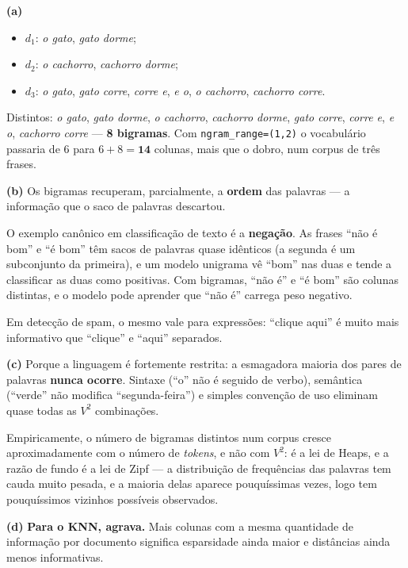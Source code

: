 \documentclass[11pt,a4paper]{article}
\begin{document}
\begin{solucao}
\textbf{(a)}
\begin{itemize}[leftmargin=1.4cm]
  \item $d_1$: \emph{o gato}, \emph{gato dorme};
  \item $d_2$: \emph{o cachorro}, \emph{cachorro dorme};
  \item $d_3$: \emph{o gato}, \emph{gato corre}, \emph{corre e}, \emph{e o},
        \emph{o cachorro}, \emph{cachorro corre}.
\end{itemize}
Distintos: \emph{o gato}, \emph{gato dorme}, \emph{o cachorro},
\emph{cachorro dorme}, \emph{gato corre}, \emph{corre e}, \emph{e o},
\emph{cachorro corre} --- \textbf{8 bigramas}. Com \texttt{ngram\_range=(1,2)} o
vocabulário passaria de $6$ para $6+8=\mathbf{14}$ colunas, mais que o dobro,
num corpus de três frases.

\smallskip
\textbf{(b)} Os bigramas recuperam, parcialmente, a \textbf{ordem} das palavras
--- a informação que o saco de palavras descartou.

O exemplo canônico em classificação de texto é a \textbf{negação}. As frases
``não é bom'' e ``é bom'' têm sacos de palavras quase idênticos (a segunda é um
subconjunto da primeira), e um modelo unigrama vê ``bom'' nas duas e tende a
classificar as duas como positivas. Com bigramas, ``não é'' e ``é bom'' são
colunas distintas, e o modelo pode aprender que ``não é'' carrega peso negativo.

Em detecção de spam, o mesmo vale para expressões: ``clique aqui'' é muito mais
informativo que ``clique'' e ``aqui'' separados.

\smallskip
\textbf{(c)} Porque a linguagem é fortemente restrita: a esmagadora maioria dos
pares de palavras \textbf{nunca ocorre}. Sintaxe (``o'' não é seguido de verbo),
semântica (``verde'' não modifica ``segunda-feira'') e simples convenção de uso
eliminam quase todas as $V^2$ combinações.

Empiricamente, o número de bigramas distintos num corpus cresce
aproximadamente com o número de \emph{tokens}, e não com $V^2$: é a lei de Heaps,
e a razão de fundo é a lei de Zipf --- a distribuição de frequências das palavras
tem cauda muito pesada, e a maioria delas aparece pouquíssimas vezes, logo tem
pouquíssimos vizinhos possíveis observados.

\smallskip
\textbf{(d)} \textbf{Para o KNN, agrava.} Mais colunas com a mesma quantidade de
informação por documento significa esparsidade ainda maior e distâncias ainda
menos informativas.


\end{solucao}
\end{document}
